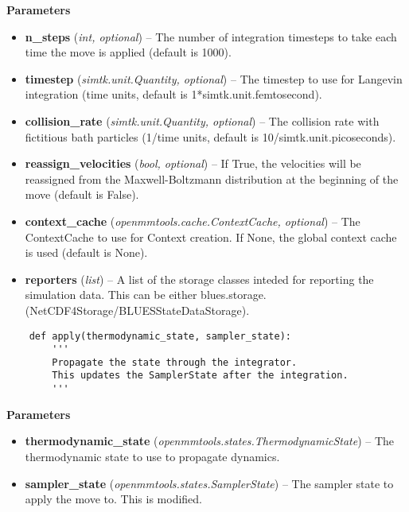 \begin{description}
\item
    \textbf{Parameters}
\begin{itemize}
\item
  \textbf{n\_steps} (\emph{int, optional}) -- The number of integration
  timesteps to take each time the move is applied (default is 1000).
\item
  \textbf{timestep} (\emph{simtk.unit.Quantity, optional}) -- The
  timestep to use for Langevin integration (time units, default is
  1*simtk.unit.femtosecond).
\item
  \textbf{collision\_rate} (\emph{simtk.unit.Quantity, optional}) -- The
  collision rate with fictitious bath particles (1/time units, default
  is 10/simtk.unit.picoseconds).
\item
  \textbf{reassign\_velocities} (\emph{bool, optional}) -- If True, the
  velocities will be reassigned from the Maxwell-Boltzmann distribution
  at the beginning of the move (default is False).
\item
  \textbf{context\_cache} (\emph{openmmtools.cache.ContextCache,
  optional}) -- The ContextCache to use for Context creation. If None,
  the global context cache is used (default is None).
\item
  \textbf{reporters} (\emph{list}) -- A list of the storage classes
  inteded for reporting the simulation data. This can be either
  blues.storage.(NetCDF4Storage/BLUESStateDataStorage).
\end{itemize}
\end{description}

\begin{description}
\item[Methods]
\item
    \begin{verbatim}
    def apply(thermodynamic_state, sampler_state):
        '''
        Propagate the state through the integrator.
        This updates the SamplerState after the integration.
        '''
    \end{verbatim}
    
    \begin{description}
    \item
        \textbf{Parameters}
    \begin{itemize}
    \item
      \textbf{thermodynamic\_state}
      (\emph{openmmtools.states.ThermodynamicState}) -- The thermodynamic
      state to use to propagate dynamics.
    \item
      \textbf{sampler\_state} (\emph{openmmtools.states.SamplerState}) --
      The sampler state to apply the move to. This is modified.
    \end{itemize}
    \end{description}
\end{description}

